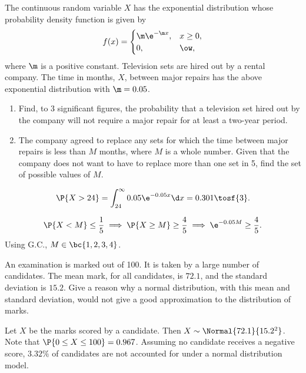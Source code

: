 \begin{problem}
    The continuous random variable $X$ has the exponential distribution whose probability density function is given by \[f(x) = \begin{cases}
        \m \e^{-\m x }, & x \geq 0,\\
        0, & \ow,
    \end{cases}\] where $\m$ is a positive constant. Television sets are hired out by a rental company. The time in months, $X$, between major repairs has the above exponential distribution with $\m=0.05$.

    \begin{enumerate}
        \item Find, to 3 significant figures, the probability that a television set hired out by the company will not require a major repair for at least a two-year period.
        \item The company agreed to replace any sets for which the time between major repairs is less than $M$ months, where $M$ is a whole number. Given that the company does not want to have to replace more than one set in 5, find the set of possible values of $M$.
    \end{enumerate}
\end{problem}
\begin{solution}
    \begin{ppart}
        \[\P{X > 24} = \int_{24}^\infty 0.05 \e^{-0.05 x} \d x = 0.301 \tosf{3}.\]
    \end{ppart}
    \begin{ppart}
        \[\P{X < M} \leq \frac15 \implies \P{X \geq M} \geq \frac45 \implies \e^{-0.05 M} \geq \frac45.\] Using G.C., $M \in \bc{1, 2, 3, 4}$.
    \end{ppart}
\end{solution}

\begin{problem}
    An examination is marked out of 100. It is taken by a large number of candidates. The mean mark, for all candidates, is $72.1$, and the standard deviation is $15.2$. Give a reason why a normal distribution, with this mean and standard deviation, would not give a good approximation to the distribution of marks.
\end{problem}
\begin{solution}
    Let $X$ be the marks scored by a candidate. Then $X \sim \Normal{72.1}{15.2^2}$. Note that $\P{0 \leq X \leq 100} = 0.967$. Assuming no candidate receives a negative score, $3.32\%$ of candidates are not accounted for under a normal distribution model.
\end{solution}

